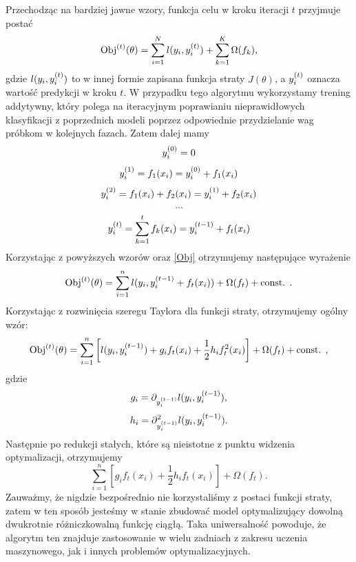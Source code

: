 \documentclass[inzynierska]{pwr_wmat_praca_dyplomowa}
\theoremstyle{plain}
\numberwithin{theorem}{chapter}
\theoremstyle{definition}
\numberwithin{theorem}{chapter}
\begin{document}
Przechodząc na bardziej jawne wzory, funkcja celu w kroku iteracji $t$ przyjmuje postać
\begin{equation}
	\label{Obj}
	\text{Obj}^{(t)}(\theta) = \sum_{i=1}^{N} l(y_i, y_i^{(t)}) + \sum_{k=1}^{K} \Omega(f_k) \text{,}
\end{equation}
gdzie $l(y_i, y_i^{(t)})$ to w innej formie zapisana funkcja straty $J(\theta)$, a $y_i^{(t)}$ oznacza wartość predykcji w kroku $t$.
W przypadku tego algorytmu wykorzystamy trening addytywny, który polega na iteracyjnym poprawianiu nieprawidłowych klasyfikacji z poprzednich modeli poprzez odpowiednie przydzielanie wag próbkom w kolejnych fazach. Zatem dalej mamy
$$ y_i^{(0)} = 0 $$
$$ y_i^{(1)} = f_1(x_i)  = y_i^{(0)} + f_1(x_i) $$
$$ y_i^{(2)} = f_1(x_i) + f_2(x_i) = y_i^{(1)} + f_2(x_i) $$
$$ ... $$
$$ y_i^{(t)} = \sum_{k=1}^{t} f_k(x_i) = y_i^{(t-1)} + f_t(x_i) $$
Korzystając z powyższych wzorów oraz \ref{Obj} otrzymujemy następujące wyrażenie
$$ \text{Obj}^{(t)}(\theta) = \sum_{i=1}^{n} l(y_i, y_i^{(t-1)} + f_t(x_i)) + \Omega(f_t) + \text{const. .}$$
Korzystając z rozwinięcia szeregu Taylora dla funkcji straty, otrzymujemy ogólny wzór:
$$ \text{Obj}^{(t)}(\theta) = \sum_{i=1}^{n} \left[ l(y_i, y_i^{(t-1)}) + g_i f_t(x_i) + \frac{1}{2} h_i f_t^2(x_i) \right] + \Omega(f_t) + \text{const. ,} $$
gdzie 
$$ g_i = \partial_{y_i^{(t-1)}} l(y_i, y_i^{(t-1)}) \text{,} $$
$$ h_i = \partial^2_{y_i^{(t-1)}} l(y_i, y_i^{(t-1)}) \text{.}$$
Następnie po redukcji stałych, które są nieistotne z punktu widzenia optymalizacji, otrzymujemy
$$ \sum_{i=1}^{n} [g_i f_t(x_i) + \frac{1}{2} h_i f_t(x_i)] + \Omega(f_t) \text{.}$$
Zauważmy, że nigdzie bezpośrednio nie korzystaliśmy z postaci funkcji straty, zatem w ten sposób jesteśmy w stanie zbudować model optymalizujący dowolną dwukrotnie różniczkowalną funkcję ciągłą. Taka uniwersalność powoduje, że algorytm ten znajduje zastosowanie w wielu zadniach z zakresu uczenia maszynowego, jak i innych problemów optymalizacyjnych.
\end{document}
